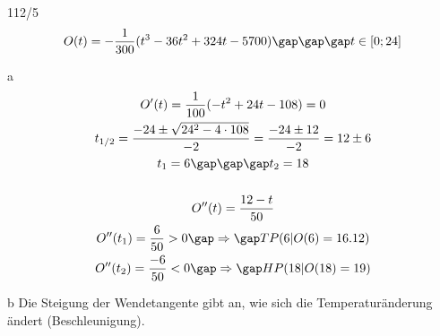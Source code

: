 \begin{exercise}{112/5}
  $$O(t) = -\frac{1}{300}(t^3 - 36t^2 + 324t - 5700) \gap\gap\gap t \in \left[0; 24\right]$$
  \item [a]
  \begin{gather*}
    O'(t) = \frac{1}{100}(-t^2 + 24t - 108) = 0 \\
    t_{1/2} = \frac{-24 \pm \sqrt{24^2 - 4 \cdot 108}}{-2} = \frac{-24 \pm 12}{-2} = 12 \pm 6 \\
    t_1 = 6 \gap\gap\gap t_2 = 18 \\\\
    O''(t) = \frac{12 - t}{50} \\
    O''(t_1) = \frac{6}{50} > 0 \gap\Rightarrow\gap TP(6|O(6) = 16.12) \\
    O''(t_2) = \frac{-6}{50} < 0 \gap\Rightarrow\gap HP(18|O(18) = 19)
  \end{gather*}
  \item [b]
  Die Steigung der Wendetangente gibt an, wie sich die Temperaturänderung ändert (Beschleunigung).
\end{exercise}
